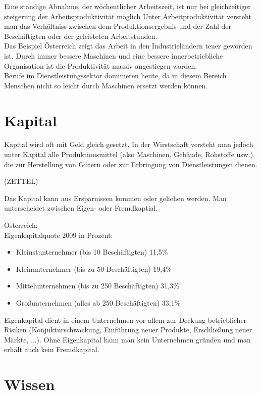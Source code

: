 \documentclass[a4paper]{report}
\begin{document}
Eine ständige Abnahme, der wöchentlicher Arbeitszeit, ist nur bei gleichzeitiger steigerung der Arbeitsproduktivität möglich
Unter Arbeitproduktivität versteht man das Verhältniss zwischen dem Produktionsergebnis und der Zahl der Beschäftigten oder der geleisteten Arbeitstunden.\\

Das Beispiel Österreich zeigt das Arbeit in den Industrieländern teuer geworden ist. Durch immer bessere Maschinen und eine bessere innerbetriebliche Organisation ist die Produktivität massiv angestiegen worden.\\

Berufe im Dienstleistungssektor dominieren heute, da in diesem Bereich Menschen nicht so leicht durch Maschinen ersetzt werden können.

\section{Kapital}

Kapital wird oft mit Geld gleich gesetzt. In der Wirstschaft versteht man jedoch unter Kapital alle Produktionsmittel (also Maschinen, Gebäude, Rohstoffe usw.), die zur Herstellung von Gütern oder zur Erbringung von Dienstleistungen dienen.

(ZETTEL)

Das Kapital kann aus Ersparnissen kommen oder geliehen werden. Man unterscheidet zwischen Eigen- oder Fremdkaptial.

Österreich:\\

Eigenkapitalquote 2009 in Prozent:\\

\begin{itemize}
\item Kleinstunternehmer (bis 10 Beschäftigten) 11,5\%
\item Kleinunternehmer (bis zu 50 Beschäftigten) 19,4\%
\item Mittelunternehmen (bis zu 250 Beschäftigten) 31,3\%
\item Großunternehmen (alles ab 250 Beschäftigten) 33,1\%
\end{itemize}

Eigenkapital dient in einem Unternehmen vor allem zur Deckung betrieblicher Risiken (Konjukturschwackung, Einführung neuer Produkte, Erschließung neuer Märkte, ...). Ohne Eigenkapital kann man kein Unternehmen gründen und man erhält auch kein Fremdkapital.

\section{Wissen}
\end{document}
